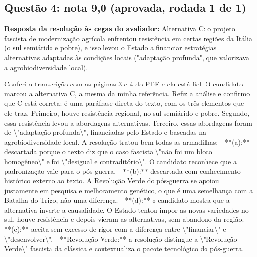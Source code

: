 \documentclass{article}%
\begin{document}
\subsection*{Questão 4: nota 9,0 (aprovada, rodada 1 de 1)}%
\textbf{Resposta da resolução às cegas do avaliador:} Alternativa C: o projeto fascista de modernização agrícola enfrentou resistência em certas regiões da Itália (o sul semiárido e pobre), e isso levou o Estado a financiar estratégias alternativas adaptadas às condições locais ("adaptação profunda", que valorizava a agrobiodiversidade local).\par %
Conferi a transcrição com as páginas 3 e 4 do PDF e ela está fiel. O candidato marcou a alternativa C, a mesma da minha referência. Refiz a análise e confirmo que C está correta: é uma paráfrase direta do texto, com os três elementos que ele traz. Primeiro, houve resistência regional, no sul semiárido e pobre. Segundo, essa resistência levou a abordagens alternativas. Terceiro, essas abordagens foram de \textbackslash{}"adaptação profunda\textbackslash{}", financiadas pelo Estado e baseadas na agrobiodiversidade local.\newline%
\newline%
A resolução tratou bem todas as armadilhas:\newline%
{-} **(a):** descartada porque o texto diz que o caso fascista \textbackslash{}"não foi um bloco homogêneo\textbackslash{}" e foi \textbackslash{}"desigual e contraditório\textbackslash{}". O candidato reconhece que a padronização vale para o pós{-}guerra.\newline%
{-} **(b):** descartada com conhecimento histórico externo ao texto. A Revolução Verde do pós{-}guerra se apoiou justamente em pesquisa e melhoramento genético, o que é uma semelhança com a Batalha do Trigo, não uma diferença.\newline%
{-} **(d):** o candidato mostra que a alternativa inverte a causalidade. O Estado tentou impor as novas variedades no sul, houve resistência e depois vieram as alternativas, sem abandono da região.\newline%
{-} **(c):** aceita sem excesso de rigor com a diferença entre \textbackslash{}"financiar\textbackslash{}" e \textbackslash{}"desenvolver\textbackslash{}".\newline%
{-} **Revolução Verde:** a resolução distingue a \textbackslash{}"Revolução Verde\textbackslash{}" fascista da clássica e contextualiza o pacote tecnológico do pós{-}guerra.\newline%
\newline%
\end{document}
